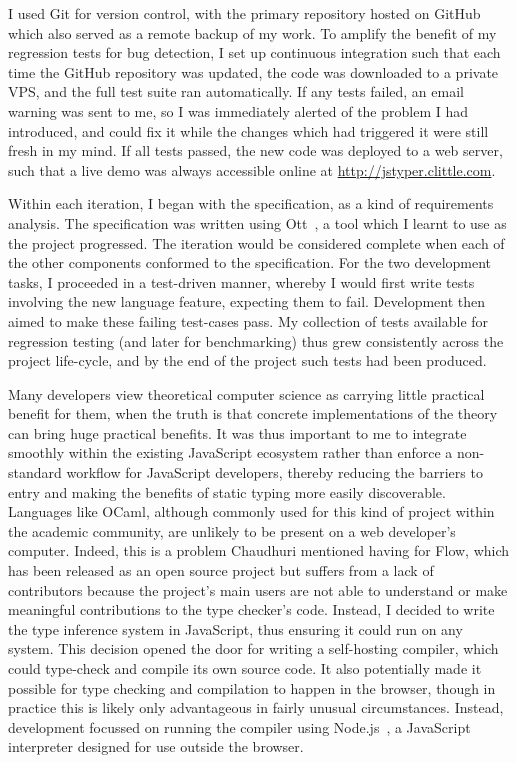 \documentclass[12pt,a4paper,twoside,openright]{report}
\theoremstyle{definition}
\theoremstyle{dotless}
\begin{document}
I used Git for version control, with the primary repository hosted on GitHub
which also served as a remote backup of my work. To amplify the benefit of my
regression tests for bug detection, I set up continuous integration such that
each time the GitHub repository was updated, the code was downloaded to a
private VPS, and the full test suite ran automatically. If any tests failed, an
email warning was sent to me, so I was immediately alerted of the problem I had
introduced, and could fix it while the changes which had triggered it were
still fresh in my mind. If all tests passed, the new code was deployed to a web
server, such that a live demo was always accessible online at
\href{http://jstyper.clittle.com}{http://jstyper.clittle.com}.

Within each iteration, I began with the specification, as a kind of
requirements analysis. The specification was written using
Ott~\cite{sewell2007ott}, a tool which I learnt to use as the project
progressed. The iteration would be considered complete when each of the other
components conformed to the specification. For the two development tasks, I
proceeded in a test-driven manner, whereby I would first write tests involving
the new language feature, expecting them to fail. Development then aimed to
make these failing test-cases pass. My collection of tests available for
regression testing (and later for benchmarking) thus grew consistently across
the project life-cycle, and by the end of the project 
such tests had been produced.

Many developers view theoretical computer science as carrying little practical
benefit for them, when the truth is that concrete implementations of the theory
can bring huge practical benefits. It was thus important to me to integrate
smoothly within the existing JavaScript ecosystem rather than enforce a
non-standard workflow for JavaScript developers, thereby reducing the barriers
to entry and making the benefits of static typing more easily discoverable.
Languages like OCaml, although commonly used for this kind of project within
the academic community, are unlikely to be present on a web developer's
computer. Indeed, this is a problem Chaudhuri mentioned having for Flow, which
has been released as an open source project but suffers from a lack of
contributors because the project's main users are not able to understand or
make meaningful contributions to the type checker's code. Instead, I decided to
write the type inference system in JavaScript, thus ensuring it could run on
any system. This decision opened the door for writing a self-hosting compiler,
which could type-check and compile its own source code. It also potentially
made it possible for type checking and compilation to happen in the browser,
though in practice this is likely only advantageous in fairly unusual
circumstances. Instead, development focussed on running the compiler using
Node.js~\cite{nodejs}, a JavaScript interpreter designed for use outside the browser.
\end{document}
